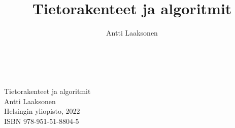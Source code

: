 \documentclass[twoside,12pt,a4paper,finnish]{book}
\begin{document}

\author{Antti Laaksonen}
\title{Tietorakenteet ja algoritmit}
\date{}
\maketitle

\thispagestyle{empty}
~\\
\vspace{16cm}
~\\
Tietorakenteet ja algoritmit \\
Antti Laaksonen \\
Helsingin yliopisto, 2022 \\
ISBN 978-951-51-8804-5 \\

\frontmatter



\tableofcontents

\mainmatter

















\appendix

%

\backmatter
\printindex
\end{document}
